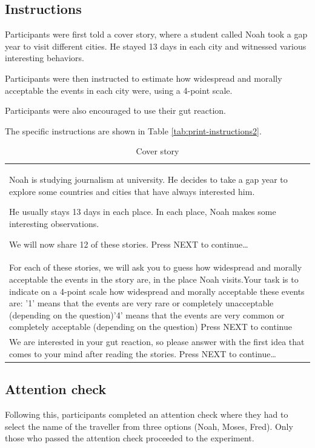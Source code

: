\documentclass[
]{article}
\begin{document}
\subsection{Instructions}\label{instructions}

Participants were first told a cover story, where a student called Noah
took a gap year to visit different cities. He stayed 13 days in each
city and witnessed various interesting behaviors.

Participants were then instructed to estimate how widespread and morally
acceptable the events in each city were, using a 4-point scale.

Participants were also encouraged to use their gut reaction.

The specific instructions are shown in Table
\ref{tab:print-instructions2}.

\begin{longtable}[t]{l}
\caption{\label{tab:print-instructions}Cover story}\\
\toprule
\\
\midrule
Noah is studying journalism at university. He decides to take a gap year to explore some countries and cities that have always interested him.

He usually stays 13 days in each place. In each place, Noah makes some interesting observations.

We will now share 12 of these stories.
Press NEXT to continue…\\
For each of these stories, we will ask you to guess how widespread and morally acceptable the events in the story are, in the place Noah visits.Your task is to indicate on a 4-point scale how widespread and morally acceptable these events are:
'1' means that the events are very rare or completely unacceptable (depending on the question)'4' means that the events are very common or completely acceptable (depending on the question)
Press NEXT to continue\\
We are interested in your gut reaction, so please answer with the first idea that comes to your mind after reading the stories.
Press NEXT to continue…\\
\bottomrule
\end{longtable}

\subsection{Attention check}\label{attention-check}

Following this, participants completed an attention check where they had
to select the name of the traveller from three options (Noah, Moses,
Fred). Only those who passed the attention check proceeded to the
experiment.
\end{document}
